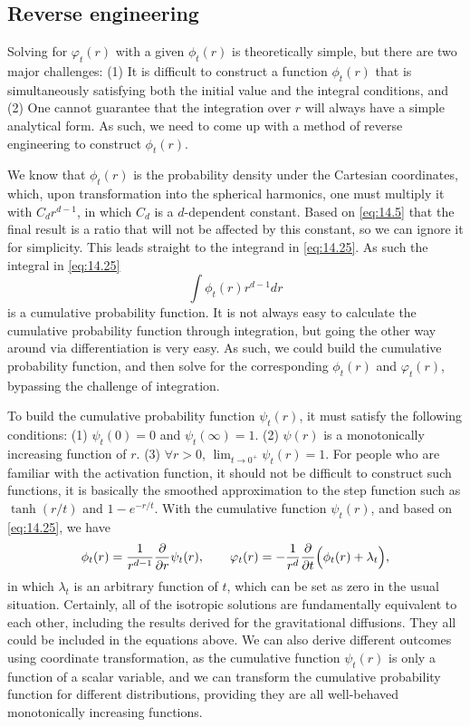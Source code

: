\subsection{Reverse engineering}
Solving for $\varphi_t(r)$ with a given $\phi_t(r)$ is theoretically simple,  but there are two major challenges: (1) It is difficult to construct a function $\phi_t(r)$ that is simultaneously satisfying both the initial value and the integral conditions, and (2) One cannot guarantee that the integration over $r$ will always have a simple analytical form. As such, we need to come up with a method of reverse engineering to construct $\phi_t(r)$. 

We know that $\phi_t(r)$ is the probability density under the Cartesian coordinates, which, upon transformation into the spherical harmonics, one must multiply it with $C_d r^{d-1}$, in which $C_d$ is a $d$-dependent constant. Based on \cref{eq:14.5} that the final result is a ratio that will not be affected by this constant, so we can ignore it for simplicity. This leads straight to the integrand in \cref{eq:14.25}. As such the integral in  \cref{eq:14.25}
\begin{equation}
    \label{eq:14.30}
    \int\phi_t(r)r^{d-1}dr
\end{equation}
is a cumulative probability function. It is not always easy to calculate the cumulative probability function through integration, but going the other way around via differentiation is very easy. As such, we could build the cumulative probability function, and then solve for the corresponding $\phi_t(r)$ and $\varphi_t(r)$, bypassing the challenge of integration. 

To build the cumulative probability function $\psi_t(r)$, it must satisfy the following conditions: (1) $\psi_t(0)=0$ and $\psi_t(\infty)=1$. (2) $\psi(r)$ is a monotonically increasing function of $r$. (3) $\forall r>0$, $\displaystyle{\lim_{t\to 0^{+}}\psi_t(r)=1}$. For people who are familiar with the activation function, it should not be difficult to construct such functions, it is basically the smoothed approximation to the step function such as $\tanh (r/t)$ and $1-e^{-r/t}$. With the cumulative function $\psi_t(r)$, and based on \cref{eq:14.25}, we have 
\begin{equation}
    \label{eq:14.31}
    \phi_t(r)=\frac{1}{r^{d-1}}\frac{\partial}{\partial r}\psi_t(r),\qquad \varphi_t(r)=-\frac{1}{r^d}\frac{\partial}{\partial t}\Bigl(\phi_t(r)+\lambda_t\Bigr),
\end{equation}
in which $\lambda_t$ is an arbitrary function of $t$, which can be set as zero in the usual situation. Certainly, all of the isotropic solutions are fundamentally equivalent to each other, including the results derived for the gravitational diffusions. They all could be included in the equations above. We can also derive different outcomes using coordinate transformation, as the cumulative function $\psi_t(r)$ is only a function of a scalar variable, and we can transform the cumulative probability function for different distributions, providing they are all well-behaved monotonically increasing functions.

